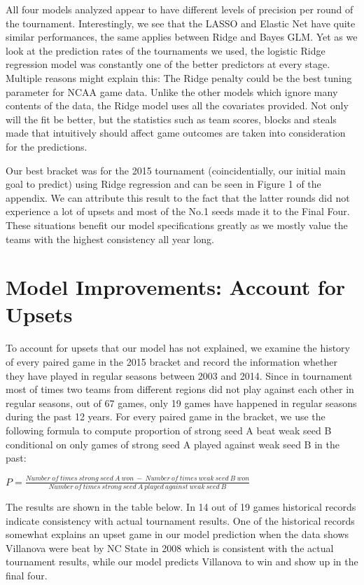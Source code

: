 \documentclass{article} %
\begin{document}
All four models analyzed appear to have different levels of precision per round of the tournament. Interestingly, we see that the LASSO and Elastic Net have quite similar performances, the same applies between Ridge and Bayes GLM. Yet as we look at the prediction rates of the tournaments we used, the logistic Ridge regression model was constantly one of the better predictors at every stage. Multiple reasons might explain this: The Ridge penalty could be the best tuning parameter for NCAA game data. Unlike the other models which ignore many contents of the data, the Ridge model uses all the covariates provided. Not only will the fit be better, but the statistics such as team scores, blocks and steals made that intuitively should affect game outcomes are taken into consideration for the predictions.

Our best bracket was for the 2015 tournament (coincidentially, our initial main goal to predict) using Ridge regression and can be seen in Figure 1 of the appendix. We can attribute this result to the fact that the latter rounds did not experience a lot of upsets and most of the No.1 seeds made it to the Final Four. These situations benefit our model specifications greatly as we mostly value the teams with the highest consistency all year long.

\section{Model Improvements: Account for Upsets}

To account for upsets that our model has not explained, we examine the history of every paired game in the 2015 bracket and record the information whether they have played in regular seasons between 2003 and 2014. Since in tournament most of times two teams from different regions did not play against each other in regular seasons, out of 67 games, only 19 games have happened in regular seasons during the past 12 years. For every paired game in the bracket, we use the following formula to compute proportion of strong seed A beat weak seed B conditional on only games of strong seed A played against weak seed B in the past:

$P=\frac{Number \ of \ times \ strong \ seed \ A \ won \ - \ Number \ of \ times \ weak \ seed \ B \ won}{Number \ of \ times \ strong \ seed \ A \ played \ against \ weak \ seed \ B }$


The results are shown in the table below. In 14 out of 19 games historical records indicate consistency with actual tournament results. One of the historical records somewhat explains an upset game in our model prediction when the data shows Villanova were beat by NC State in 2008 which is consistent with the actual tournament results, while our model predicts Villanova to win and show up in the final four. 
\end{document}
